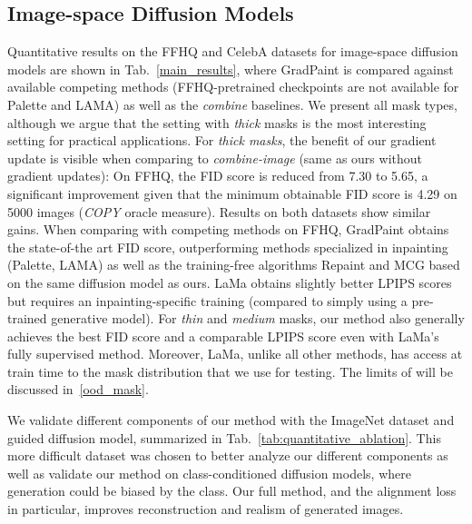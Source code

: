 \subsection{Image-space Diffusion Models}

Quantitative results on the FFHQ and CelebA datasets for image-space diffusion models are shown in Tab.~\ref{main_results}, 
where GradPaint is compared against 
available competing methods (FFHQ-pretrained checkpoints are not available for Palette and LAMA) as well as the \textit{combine} 
baselines. We present all mask types, although we argue that the setting with \emph{thick} masks is the most interesting 
setting for practical applications. For \emph{thick masks},
the benefit of our gradient update is visible when comparing to \textit{combine-image}
(same as ours without gradient updates): On FFHQ, the FID score is reduced from 7.30 to 5.65, a significant improvement given that 
the minimum obtainable FID score is 4.29 on 5000 images (\textit{COPY} oracle measure). Results on both datasets show similar gains. 
When comparing with competing methods on FFHQ, GradPaint obtains the state-of-the art FID score, outperforming methods specialized in 
inpainting (Palette, LAMA) as well as the training-free algorithms Repaint and MCG based on the same diffusion model as ours. LaMa 
obtains slightly better LPIPS scores but requires an inpainting-specific training (compared to simply using a pre-trained generative 
model). For \emph{thin} and \emph{medium} masks, our method also  generally achieves the best FID score 
and a comparable LPIPS score even with LaMa's fully supervised method. Moreover, LaMa, unlike all other methods, 
has access at train time to the mask distribution that we use for testing.  
The limits of  
will be discussed in~\ref{ood_mask}.



We validate different components of our method with the ImageNet\citep{deng2009imagenet} dataset and  guided diffusion model, summarized in 
Tab.~\ref{tab:quantitative_ablation}. This more difficult dataset was chosen to better analyze our different components as well as 
validate our method on class-conditioned diffusion models, where generation could be biased by the class. Our full method, and the 
alignment loss in particular, improves reconstruction and realism of generated images.





